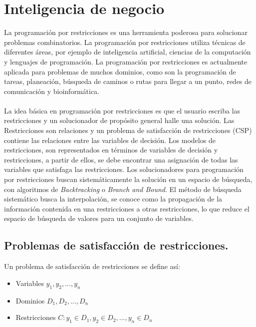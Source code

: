 \section{Inteligencia de negocio}

La programación por restricciones \cite{Francesca} es una herramienta poderosa para solucionar problemas combinatorios. La programación por restricciones utiliza técnicas de diferentes áreas, por ejemplo de inteligencia artificial, ciencias de la computación y lenguajes de programación. La programación por restricciones es actualmente aplicada para problemas de muchos dominios, como son la programación de tareas, planeación, búsqueda de caminos o rutas para llegar a un punto, redes de comunicación y bioinformática. 
\\ \\
La idea básica en programación por restricciones es que el usuario escriba las restricciones y un solucionador de propósito general halle una solución. Las Restricciones son relaciones y un problema de satisfacción de restricciones (CSP) contiene las relaciones entre las variables de decisión. Los modelos de restricciones, son representados en términos de variables de decisión y restricciones, a partir de ellos, se debe encontrar una asignación de todas las variables que satisfaga las restricciones. Los solucionadores para programación por restricciones buscan sistemáticamente la solución en un espacio de búsqueda, con algoritmos de \textit{Backtracking} o \textit{Branch and Bound}. El método de búsqueda sistemático busca la interpolación, se conoce como la propagación de la información contenida en una restricciones a otras restricciones, lo que reduce el espacio de búsqueda de valores para un conjunto de variables.

\subsection{Problemas de satisfacci\'on de restricciones.}

Un problema de satisfacción de restricciones \cite{Krzysztof} se define así:

\begin{itemize}
\item Variables $y_{1},y_{2},...,y_{n}$
\item Dominios  $D_{1},D_{2},...,D_{n}$
\item Restricciones  $C: y_{1} \in D_{1},y_{2} \in D_{2},...,y_{n} \in D_{n}$
\end{itemize}

